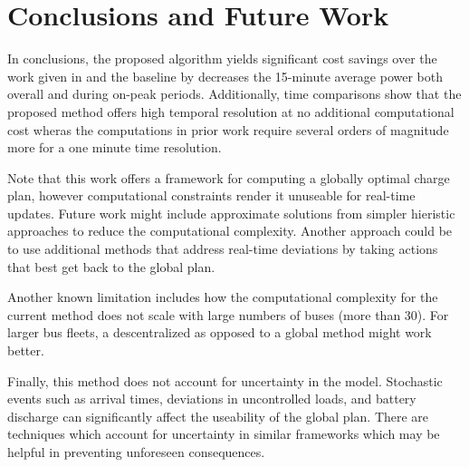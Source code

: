 \section{Conclusions and Future Work }
In conclusions, the proposed algorithm yields significant cost savings over the work given in \cite{He_2019_Fast} and the baseline by decreases the 15-minute average power both overall and during on-peak periods. Additionally, time comparisons show that the proposed method offers high temporal resolution at no additional computational cost wheras the computations in prior work require several orders of magnitude more for a one minute time resolution.
\par Note that this work offers a framework for computing a globally optimal charge plan, however computational constraints render it unuseable for real-time updates. Future work might include approximate solutions from simpler hieristic approaches to reduce the computational complexity.  Another approach could be to use additional methods that address real-time deviations by taking actions that best get back to the global plan.
\par Another known limitation includes how the computational complexity for the current method does not scale with large numbers of buses (more than 30). For larger bus fleets, a descentralized as opposed to a global method might work better. 
\par Finally, this method does not account for uncertainty in the model.  Stochastic events such as arrival times, deviations in uncontrolled loads, and battery discharge can significantly affect the useability of the global plan. There are techniques which account for uncertainty in similar frameworks which may be helpful in preventing unforeseen consequences.

